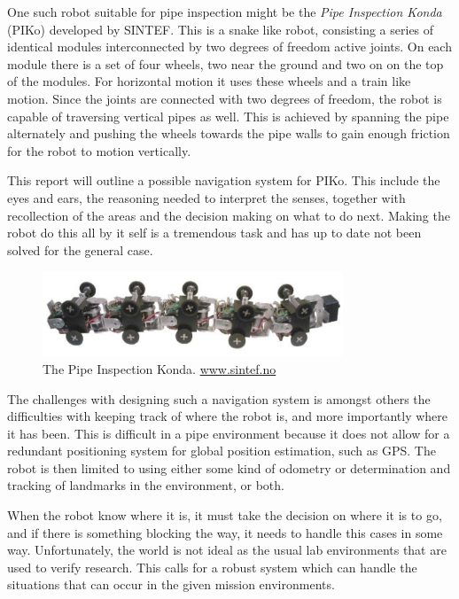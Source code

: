 One such robot suitable for pipe inspection might be the \emph{Pipe Inspection Konda}
(PIKo) developed by SINTEF. This is a snake like robot, consisting a series of identical
modules interconnected by two degrees of freedom active joints. On each module there is a
set of four wheels, two near the ground and two on on the top of the modules. For
horizontal motion it uses these wheels and a train like motion. Since the joints are
connected with two degrees of freedom, the robot is capable of traversing vertical pipes
as well. This is achieved by spanning the pipe alternately and pushing the wheels towards
the pipe walls to gain enough friction for the robot to motion vertically. \cite{piko}

This report will outline a possible navigation system for PIKo. This include the eyes and
ears, the reasoning needed to interpret the senses, together with recollection of the
areas and the decision making on what to do next. Making the robot do this all by it self
is a tremendous task and has up to date not been solved for the general case.
\begin{figure}[htbp]
    \centering
    \includegraphics[width=0.8\textwidth]{pics/piko}
    \caption{The Pipe Inspection Konda. \url{www.sintef.no}}
    \label{chap1:fig-piko}
\end{figure}

The challenges with designing such a navigation system is amongst others the difficulties
with keeping track of where the robot is, and more importantly where it has been. This is
difficult in a pipe environment because it does not allow for a redundant positioning
system for global position estimation, such as GPS. The robot is then limited to using
either some kind of odometry or determination and tracking of landmarks in the environment, 
or both. 

When the robot know where it is, it must take the decision on where it is to go, and if
there is something blocking the way, it needs to handle this cases in some way.
Unfortunately, the world is not ideal as the usual lab environments that are used to
verify research. This calls for a robust system which can handle the situations that can
occur in the given mission environments. 

